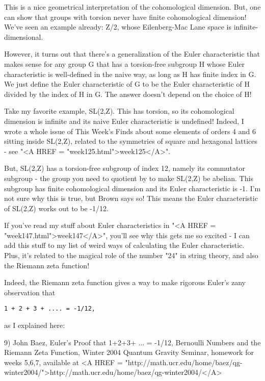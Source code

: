 This is a nice geometrical interpretation of the cohomological dimension.  
But, one can show that groups with torsion never have finite cohomological
dimension!  We've seen an example already: Z/2, whose Eilenberg-Mac Lane
space is infinite-dimensional.

However, it turns out that there's a generalization of the Euler 
characteristic that makes sense for any group G that has a torsion-free 
subgroup H whose Euler characteristic is well-defined in the naive way, 
as long as H has finite index in G.  We just define the Euler characteristic
of G to be the Euler characteristic of H divided by the index of H in G.
The answer doesn't depend on the choice of H!

Take my favorite example, SL(2,Z).  This has torsion, so its cohomological
dimension is infinite and its naive Euler characteristic is undefined!  
Indeed, I wrote a whole issue of This Week's Finds about some elements of 
orders 4 and 6 sitting inside SL(2,Z), related to the symmetries of square 
and hexagonal lattices - see "<A HREF = "week125.html">week125</A>".   

But, SL(2,Z) has a torsion-free subgroup of index 12, namely its
commutator subgroup - the group you need to quotient by to make SL(2,Z)
be abelian.  This subgroup has finite cohomological dimension and its
Euler characteristic is -1.  I'm not sure why this is true, but Brown says
so!  This means the Euler characteristic of SL(2,Z) works out to be -1/12.  

If you've read my stuff about Euler characteristics in "<A HREF = "week147.html">week147</A>", you'll
see why this gets me so excited - I can add this stuff to my list of
weird ways of calculating the Euler characteristic.  Plus, it's related 
to the magical role of the number "24" in string theory, and also the 
Riemann zeta function!

Indeed, the Riemann zeta function gives a way to make rigorous Euler's
zany observation that

\begin{verbatim}
1 + 2 + 3 + .... = -1/12,
\end{verbatim}
    
as I explained here:

9) John Baez, Euler's Proof that 1+2+3+ ... = -1/12, Bernoulli
Numbers and the Riemann Zeta Function, Winter 2004 Quantum Gravity 
Seminar, homework for weeks 5,6,7, available at 
<A HREF = "http://math.ucr.edu/home/baez/qg-winter2004/">http://math.ucr.edu/home/baez/qg-winter2004/</A>


